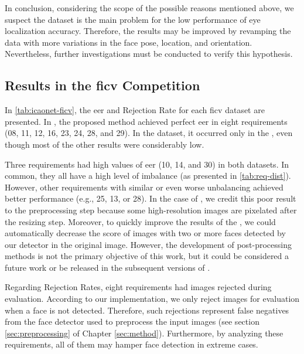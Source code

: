 In conclusion, considering the scope of the possible reasons mentioned above, we suspect the dataset is the main problem for the low performance of eye localization accuracy. Therefore, the results may be improved by revamping the data with more variations in the face pose, location, and orientation. Nevertheless, further investigations must be conducted to verify this hypothesis.
 
 
\subsection{Results in the \acs{ficv} Competition} \label{sec:ficv_results}
 
In \autoref{tab:icaonet-ficv}, the \acl{eer} and Rejection Rate for each \acs{ficv} dataset are presented. In \ficvtest, the proposed method achieved perfect \acs{eer} in eight requirements (08, 11, 12, 16, 23, 24, 28, and 29). In the \ficvofficial dataset, it occurred only in the \veiloverface, even though most of the other results were considerably low. 
 

 
Three requirements had high values of \acs{eer} (10, 14, and 30) in both datasets. In common, they all have a high level of imbalance (as presented in \autoref{tab:req-dist}). However, other requirements with similar or even worse unbalancing achieved better performance (e.g., 25, 13, or 28). In the case of \pixelation, we credit this poor result to the preprocessing step because some high-resolution images are pixelated after the resizing step. Moreover, to quickly improve the results of the \otherfacesortoys, we could automatically decrease the score of images with two or more faces detected by our detector in the original image. However, the development of post-processing methods is not the primary objective of this work, but it could be considered a future work or be released in the subsequent versions of \methodname.
 
Regarding Rejection Rates, eight requirements had images rejected during evaluation. According to our implementation, we only reject images for evaluation when a face is not detected. Therefore, such rejections represent false negatives from the face detector used to preprocess the input images (see section \ref{sec:preprocessing} of Chapter \ref{sec:method}). Furthermore, by analyzing these requirements, all of them may hamper face detection in extreme cases. 
 
